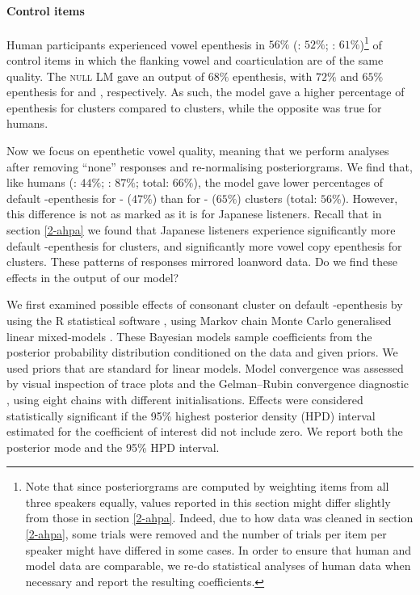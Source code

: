 {\paragraph{Control items}
Human participants experienced vowel epenthesis in $56\%$ (: $52\%$; : $61\%$)\footnote{Note that since posteriorgrams are computed by weighting items from all three speakers equally, values reported in this section might differ slightly from those in section \ref{2-ahpa}. Indeed, due to how data was cleaned in section \ref{2-ahpa}, some trials were removed and the number of trials per item per speaker might have differed in some cases. In order to ensure that human and model data are comparable, we re-do statistical analyses of human data when necessary and report the resulting coefficients.} of control items in which the flanking vowel and coarticulation are of the same quality. The \textsc{null LM} gave an output of $68\%$ epenthesis, with $72\%$ and $65\%$ epenthesis for  and , respectively. As such, the model gave a higher percentage of epenthesis for  clusters compared to clusters, while the opposite was true for humans.

Now we focus on epenthetic vowel quality, meaning that we perform analyses after removing ``none'' responses and re-normalising posteriorgrams. We find that, like humans (: $44\%$; : $87\%$; total: $66\%$), the model gave lower percentages of default -epenthesis for - ($47\%$) than for - ($65\%$) clusters (total: $56\%$). However, this difference is not as marked as it is for Japanese listeners. Recall that in section \ref{2-ahpa} we found that Japanese listeners experience significantly more default -epenthesis for  clusters, and significantly more vowel copy epenthesis for  clusters. These patterns of responses mirrored loanword data. Do we find these effects in the output of our model? 

We first examined possible effects of consonant cluster on default -epenthesis by using the R statistical software \cite{R-base}, using Markov chain Monte Carlo generalised linear mixed-models \cite{R-MCMCglmm, R-coda}. These Bayesian models sample coefficients from the posterior probability distribution conditioned on the data and given priors. We used priors that are standard for linear models. Model convergence was assessed by visual inspection of trace plots and the Gelman–Rubin convergence diagnostic \cite{gelman1992}, using eight chains with different initialisations. Effects were considered statistically significant if the 95\% highest posterior density (HPD) interval estimated for the coefficient of interest did not include zero. We report both the posterior mode and the 95\% HPD interval.  

}
